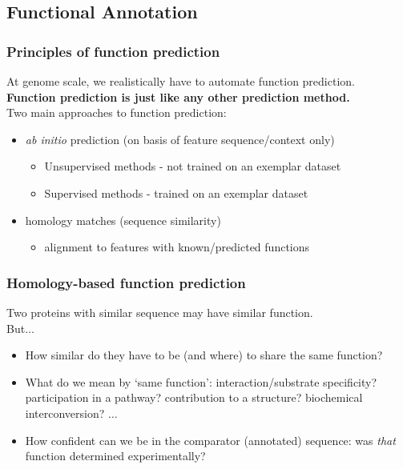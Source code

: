 
\subsection{Functional Annotation}

\begin{frame}
  \frametitle{Principles of function prediction}
  At genome scale, we realistically have to automate function prediction. \\
  \textbf{Function prediction is just like any other prediction method.} \\
  Two main approaches to function prediction:
  \begin{itemize}
    \item \textit{ab initio} prediction (on basis of feature sequence/context only)
    \begin{itemize}
      \item Unsupervised methods - not trained on an exemplar dataset
      \item Supervised methods - trained on an exemplar dataset
    \end{itemize}
    \item homology matches (sequence similarity)
    \begin{itemize}
      \item alignment to features with known/predicted functions
    \end{itemize}
  \end{itemize}
\end{frame}

\begin{frame}
  \frametitle{Homology-based function prediction}
  Two proteins with similar sequence may have similar function.\\
  But$\ldots$
  \begin{itemize}
    \item How similar do they have to be (and where) to share the same function?
    \item What do we mean by `same function': interaction/substrate specificity? participation in a pathway? contribution to a structure? biochemical interconversion? $\ldots$
    \item How confident can we be in the comparator (annotated) sequence: was \textit{that} function determined experimentally?
  \end{itemize}
\end{frame}

